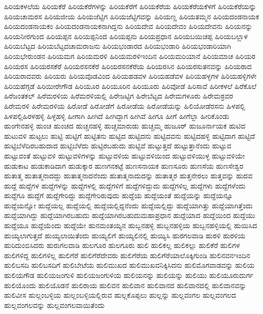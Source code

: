 {ಹಿರಿಯಕಳಲೆಯ
ಹಿರಿಯಕೆರೆ
ಹಿರಿಯಕೆರೆಗಳನ್ನು
ಹಿರಿಯಕೆರೆಗೆ
ಹಿರಿಯಕೆರೆಯ
ಹಿರಿಯಕೆರೆಯಕೆಳಗೆ
ಹಿರಿಯಕೆರೆಯನ್ನು
ಹಿರಿಯಚಾಮರಸ
ಹಿರಿಯಜೀಯ
ಹಿರಿಯಜೆಟ್ಟಿಗ
ಹಿರಿಯಜೆಟ್ಟಿಗವನ್ನು
ಹಿರಿಯಣ್ಣ
ಹಿರಿಯತಮ್ಮನ
ಹಿರಿಯದಂಡನಾಯಕ
ಹಿರಿಯದಂಡನಾಯಕಂ
ಹಿರಿಯದಂಡನಾಯಕನಾಗಿದ್ದನು
ಹಿರಿಯದೇವ
ಹಿರಿಯದೇವಂ
ಹಿರಿಯದೇವನು
ಹಿರಿಯನನ್ನು
ಹಿರಿಯನೀರಗುಂದ
ಹಿರಿಯಪ್ಪನ
ಹಿರಿಯಪ್ಪನಿಂದ
ಹಿರಿಯಪ್ಪನು
ಹಿರಿಯಪ್ರಧಾನ
ಹಿರಿಯಬಯಿಚಪ್ಪ
ಹಿರಿಯಬಲ್ಲಾಳ
ಹಿರಿಯಬೆಟ್ಟದ
ಹಿರಿಯಬೆಟ್ಟದಚಾಮರಾಜನು
ಹಿರಿಯಭಂಡಾರದ
ಹಿರಿಯಭಂಡಾರಿ
ಹಿರಿಯಭಂಡಾರಿಯಾಗಿ
ಹಿರಿಯಭೇರುಂಡನ
ಹಿರಿಯಮಗ
ಹಿರಿಯಮರಳಿ
ಹಿರಿಯಮರಳಿಇಂದಿನ
ಹಿರಿಯಮರಿಯಾನೆ
ಹಿರಿಯಮಾಚ
ಹಿರಿಯರ
ಹಿರಿಯರಸ
ಹಿರಿಯರಸಕೆರೆ
ಹಿರಿಯರಸನಕೆರೆ
ಹಿರಿಯರಸನಕೆರೆಯ
ಹಿರಿಯರಸಿನ
ಹಿರಿಯರಸುತನವನ್ನು
ಹಿರಿಯರಾದ
ಹಿರಿಯರಾದವರು
ಹಿರಿಯರು
ಹಿರಿಯವೊಡವಿಂದ
ಹಿರಿಯಹಡವಳ
ಹಿರಿಯಹಡೆವಳ
ಹಿರಿಯಹಳ್ಳಗಳ
ಹಿರಿಯಹಳ್ಳಿಗಳೇ
ಹಿರಿಯಹೆಗ್ಗಡೆ
ಹಿರಿಯೀರೇಗೌಡ
ಹಿರಿಯೂರ
ಹಿರಿಯೂರಿನ
ಹಿರಿಯೂರು
ಹಿರಿವೋಡೆ
ಹಿರಿಸಾವೆ
ಹಿರೀಕಳಲೆ
ಹಿರೆಕೊಲೆ
ಹಿರೆಜಂತಕಲ್
ಹಿರೆಮರಳಿಯ
ಹಿರೆಮರಳಿಯಲ್ಲಿ
ಹಿರೇಜಟ್ಟಿಗ
ಹಿರೇಬೆಟ್ಟದ
ಹಿರೇಮಗಳೂರು
ಹಿರೇಮಠ್ರವರ
ಹಿರೇಮರಳಿ
ಹಿರೇಮರಳಿಯ
ಹಿರೋಡೆ
ಹಿರೋಡೆಗೆ
ಹಿರೋಡೆಯ
ಹಿರೋಡೆಯನ್ನು
ಹಿಲಿಯೋಡೆರಸನು
ಹಿಳಪಲ್ಲಿ
ಹಿಳಪಲ್ಲಿಹಿರಳಹಳ್ಳಿ
ಹಿಳ್ಳಹಳ್ಳಿ
ಹೀಗಾಗಿ
ಹೀಗಿದೆ
ಹೀಗಿದ್ದಾಗ
ಹೀಗಿವೆ
ಹೀಗೂ
ಹೀಗೆ
ಹೀಗೆಲ್ಲಾ
ಹೀರಿಕೊಂಡು
ಹುಂಗೇನಹಳ್ಳಿ
ಹುಂಚ
ಹುಂಚದ
ಹುಚ್ಚನಹಳ್ಳಿ
ಹುಚ್ಚಮಾರುಡು
ಹುಚ್ಚಮ್ಮ
ಹುಜೂರ್
ಹುಜೂರ್ನಾಯಕ
ಹುಟಿದ
ಹುಟುವಳಿ
ಹುಟ್ಟಲು
ಹುಟ್ಟಿ
ಹುಟ್ಟಿಗೆ
ಹುಟ್ಟಿತನು
ಹುಟ್ಟಿದ
ಹುಟ್ಟಿದನು
ಹುಟ್ಟಿದವನು
ಹುಟ್ಟಿದಹಳ್ಳಿ
ಹುಟ್ಟಿದಾಗ
ಹುಟ್ಟಿದೆ
ಹುಟ್ಟಿಬೆಳೆದಿರಬಹುದಾದ
ಹುಟ್ಟಿಬೆಳೆದು
ಹುಟ್ಟಿರಬಹುದು
ಹುಟ್ಟಿವೆ
ಹುಟ್ಟುತ್ತದೆ
ಹುಟ್ಟುತ್ತಾನೆಂದು
ಹುಟ್ಟುವ
ಹುಟ್ಟುವಂತೆ
ಹುಟ್ಟುವಳಿ
ಹುಟ್ಟುವಳಿಗಳನ್ನು
ಹುಟ್ಟುವಳಿಯ
ಹುಟ್ಟುವಳಿಯಿಂದ
ಹುಟ್ಟುವಳಿಯುಳ್ಳ
ಹುಟ್ಟುವಳಿಯೇ
ಹುಡುಕಾಟ
ಹುಡುಕಾಡಿದಾಗ
ಹುಡುಕ್ಕಾರ
ಹುಣಗನಕಟ್ಟೆ
ಹುಣಸನಾಯಕ
ಹುಣಸೂರು
ಹುಣಸೆಯ
ಹುಣಸೇಶ್ವರ
ಹುತಾತ್ಮ
ಹುತಾತ್ಮನಾದದ್ದು
ಹುತಾತ್ಮನಾದನೆಂದು
ಹುತಾತ್ಮನಾದುದನ್ನು
ಹುತಾತ್ಮರ
ಹುತ್ತನೇರಲು
ಹುತ್ತವನ್ನು
ಹುದವ
ಹುದ್ದೆ
ಹುದ್ದೆಗಳ
ಹುದ್ದೆಗಳನ್ನು
ಹುದ್ದೆಗಳಲ್ಲಿ
ಹುದ್ದೆಗಳಿಗೆ
ಹುದ್ದೆಗಳಿದ್ದುದು
ಹುದ್ದೆಗಳಿಲ್ಲ
ಹುದ್ದೆಗಳು
ಹುದ್ದೆಗಳೆಂದು
ಹುದ್ದೆಗೂ
ಹುದ್ದೆಗೆ
ಹುದ್ದೆಗೇರಿದ್ದು
ಹುದ್ದೆಗೇರಿರುವುದು
ಹುದ್ದೆಯ
ಹುದ್ದೆಯಂತೆ
ಹುದ್ದೆಯನ್ನು
ಹುದ್ದೆಯನ್ನೂ
ಹುದ್ದೆಯನ್ನೋ
ಹುದ್ದೆಯಲ್ಲ
ಹುದ್ದೆಯಲ್ಲಿ
ಹುದ್ದೆಯಲ್ಲಿದ್ದನೆಂದು
ಹುದ್ದೆಯಲ್ಲಿದ್ದು
ಹುದ್ದೆಯಾಗಿತ್ತು
ಹುದ್ದೆಯಾಗಿತ್ತೆಂದು
ಹುದ್ದೆಯಾಗಿದ್ದು
ಹುದ್ದೆಯಾಗಿರಬಹುದು
ಹುದ್ದೆಯಾಗಿರಬಹುದುಮಹಾಪ್ರಧಾನ
ಹುದ್ದೆಯಾದ
ಹುದ್ದೆಯಿಂದ
ಹುದ್ದೆಯು
ಹುದ್ದೆಯೂ
ಹುದ್ದೆಯೆಂದು
ಹುದ್ದೆಯೇ
ಹುನಮಂತಯ್ಯನ
ಹುಬ್ಬನಹಳ್ಳಿ
ಹುಬ್ಬನಹಳ್ಳಿಯ
ಹುಬ್ಬನಹಳ್ಳಿಯಲ್ಲಿ
ಹುಯಿಸಿದ
ಹುಯ್ಯಲಾಗುತ್ತದೆ
ಹುಯ್ಯಲಾಯಿತೆಂದು
ಹುಯ್ಯಲಿಗೆ
ಹುಯ್ಯಲಿನಲ್ಲಿ
ಹುಯ್ಯಿಸಿ
ಹುರಗಲವಾಡಿ
ಹುರಳಿ
ಹುರಳಿಯ
ಹುರಿದುಂಬಿಸಿದರು
ಹುರುಗಲವಾಡಿ
ಹುಲಗೂರ
ಹುಲಗೂರು
ಹುಲಿ
ಹುಲಿಕಲ್ಲ
ಹುಲಿಕಲ್ಲು
ಹುಲಿಕೆರೆ
ಹುಲಿಗಳ
ಹುಲಿಗಳಿದ್ದ
ಹುಲಿಗಳಿಲ್ಲ
ಹುಲಿಗೆರೆ
ಹುಲಿಗೆರೆದೇವರು
ಹುಲಿಗೆರೆಯ
ಹುಲಿಗೆರೆಯಾಲೊಕ್ಕಿಗುಂಡಿ
ಹುಲಿನವನಇಂದಿನ
ಹುಲಿಬಸದಿ
ಹುಲಿಬಸದಿಗೆ
ಹುಲಿಬೇಟೆಯ
ಹುಲಿಮುಖದ
ಹುಲಿಮುಖವನಿಕ್ಕಿಸಿದನು
ಹುಲಿಮೊಗವಾಡವನ್ನು
ಹುಲಿಯ
ಹುಲಿಯಗೌಡ
ಹುಲಿಯಜಂಗುಳಿ
ಹುಲಿಯಜಂಗುಳಿಯ
ಹುಲಿಯನನ್ನು
ಹುಲಿಯನ್ನು
ಹುಲಿಯು
ಹುಲಿಯೂರುದುರ್ಗ
ಹುಲಿಯೊಂದು
ಹುಲಿಯೊಡನೆ
ಹುಲಿರಾಯ
ಹುಲಿವನ
ಹುಲಿವಾನ
ಹುಲಿವಾನದ
ಹುಲಿವಾನದಲ್ಲಿ
ಹುಲಿವಾನವನ್ನು
ಹುಲಿವೀಸ
ಹುಲ್ಲಂಬಳ್ಳಿಯ
ಹುಲ್ಲಂಬಳ್ಳಿಯಲ್ಲಿರುವ
ಹುಲ್ಲಕೊಪ್ಪಲು
ಹುಲ್ಲನ್ನು
ಹುಲ್ಲವಂಗಲ
ಹುಲ್ಲವಂಗಲದ
ಹುಲ್ಲವಂಗಲವನ್ನು
ಹುಲ್ಲವಂಗಲವಾಯಿತೆಂದು
}
